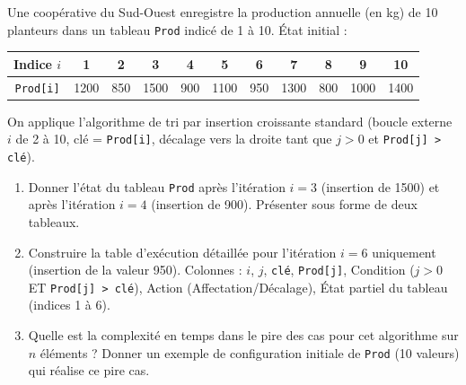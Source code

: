 \documentclass[11pt]{article}
\begin{document}
\begin{exercice}
Une coopérative du Sud-Ouest enregistre la production annuelle (en kg) de \num{10} planteurs dans un tableau \texttt{Prod} indicé de 1 à 10. État initial : 
\begin{center}
\begin{tabular}{|c|c|c|c|c|c|c|c|c|c|c|}
\hline
Indice $i$ & 1 & 2 & 3 & 4 & 5 & 6 & 7 & 8 & 9 & 10 \\ \hline
\texttt{Prod[i]} & 1200 & 850 & 1500 & 900 & 1100 & 950 & 1300 & 800 & 1000 & 1400 \\ \hline
\end{tabular}
\end{center}
On applique l'algorithme de tri par insertion croissante standard (boucle externe $i$ de 2 à 10, clé = \texttt{Prod[i]}, décalage vers la droite tant que $j>0$ et \texttt{Prod[j] > clé}).

\begin{enumerate}
    \item Donner l'état du tableau \texttt{Prod} après l'itération $i = 3$ (insertion de 1500) et après l'itération $i = 4$ (insertion de 900). Présenter sous forme de deux tableaux.
    \item Construire la table d'exécution détaillée pour l'itération $i = 6$ uniquement (insertion de la valeur 950). Colonnes : $i$, $j$, \texttt{clé}, \texttt{Prod[j]}, Condition ($j>0$ ET \texttt{Prod[j] > clé}), Action (Affectation/Décalage), État partiel du tableau (indices 1 à 6).
    \item Quelle est la complexité en temps dans le pire des cas pour cet algorithme sur $n$ éléments ? Donner un exemple de configuration initiale de \texttt{Prod} (10 valeurs) qui réalise ce pire cas.
\end{enumerate}
\end{exercice}
\end{document}
